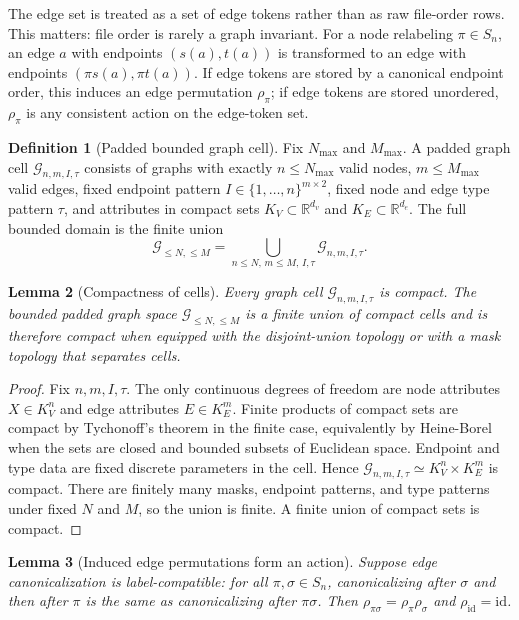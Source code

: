 \documentclass[11pt]{article}
\theoremstyle{definition}
\newtheorem{definition}{Definition}[section]
\theoremstyle{plain}
\newtheorem{lemma}[definition]{Lemma}
\theoremstyle{remark}
\numberwithin{equation}{section}
\newcommand{\R}{\mathbb{R}}
\newcommand{\G}{\mathcal{G}}
\begin{document}
The edge set is treated as a set of edge tokens rather than as raw file-order rows.  This matters: file order is rarely a graph invariant.  For a node relabeling $\pi\in S_n$, an edge $a$ with endpoints $(s(a),t(a))$ is transformed to an edge with endpoints $(\pi s(a),\pi t(a))$.  If edge tokens are stored by a canonical endpoint order, this induces an edge permutation $\rho_\pi$; if edge tokens are stored unordered, $\rho_\pi$ is any consistent action on the edge-token set.

\begin{definition}[Padded bounded graph cell]
Fix $N_{\max}$ and $M_{\max}$.  A padded graph cell $\G_{n,m,I,\tau}$ consists of graphs with exactly $n\le N_{\max}$ valid nodes, $m\le M_{\max}$ valid edges, fixed endpoint pattern $I\in\{1,\ldots,n\}^{m\times 2}$, fixed node and edge type pattern $\tau$, and attributes in compact sets $K_V\subset\R^{d_v}$ and $K_E\subset\R^{d_e}$.  The full bounded domain is the finite union
\begin{equation}
  \G_{\le N,\le M}=\bigcup_{n\le N,\,m\le M,\,I,\tau}\G_{n,m,I,\tau}.
\end{equation}
\end{definition}

\begin{lemma}[Compactness of cells]
Every graph cell $\G_{n,m,I,\tau}$ is compact.  The bounded padded graph space $\G_{\le N,\le M}$ is a finite union of compact cells and is therefore compact when equipped with the disjoint-union topology or with a mask topology that separates cells.
\end{lemma}

\begin{proof}
Fix $n,m,I,\tau$.  The only continuous degrees of freedom are node attributes $X\in K_V^n$ and edge attributes $E\in K_E^m$.  Finite products of compact sets are compact by Tychonoff's theorem in the finite case, equivalently by Heine-Borel when the sets are closed and bounded subsets of Euclidean space.  Endpoint and type data are fixed discrete parameters in the cell.  Hence $\G_{n,m,I,\tau}\simeq K_V^n\times K_E^m$ is compact.  There are finitely many masks, endpoint patterns, and type patterns under fixed $N$ and $M$, so the union is finite.  A finite union of compact sets is compact.
\end{proof}

\begin{lemma}[Induced edge permutations form an action]
Suppose edge canonicalization is label-compatible: for all $\pi,\sigma\in S_n$, canonicalizing after $\sigma$ and then after $\pi$ is the same as canonicalizing after $\pi\sigma$.  Then $\rho_{\pi\sigma}=\rho_\pi\rho_\sigma$ and $\rho_{\mathrm{id}}=\mathrm{id}$.
\end{lemma}
\end{document}

